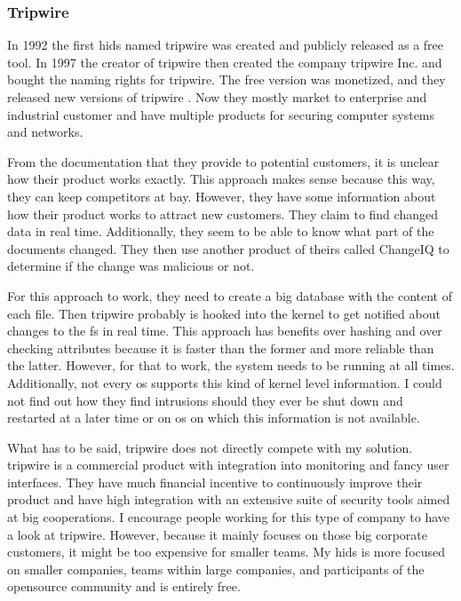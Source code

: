 \subsubsection{Tripwire}
\label{sec:tripwire}

In 1992 the first \gls{hids} named \gls{tripwire} was created and publicly released as a free tool. In 1997 the creator of \gls{tripwire} then created the company \Gls{tripwire} Inc. and bought the naming rights for \gls{tripwire}. The free version was monetized, and they released new versions of \gls{tripwire} \cite{Tripwire:Impl, Tripwire:company}. Now they mostly market to enterprise and industrial customer and have multiple products for securing computer systems and networks. \cite{tripwire}

From the documentation that they provide to potential customers, it is unclear how their product works exactly. This approach makes sense because this way, they can keep competitors at bay. However, they have some information about how their product works to attract new customers. They claim to find changed data in real time. Additionally, they seem to be able to know what part of the documents changed. They then use another product of theirs called ChangeIQ to determine if the change was malicious or not. \cite{tripwire:fim:datasheet, tripwire:true:intent}

For this approach to work, they need to create a big database with the content of each file. Then \gls{tripwire} probably is hooked into the kernel to get notified about changes to the \gls{fs} in real time. This approach has benefits over hashing and over checking attributes because it is faster than the former and more reliable than the latter. However, for that to work, the system needs to be running at all times. Additionally, not every \gls{os} supports this kind of kernel level information. I could not find out how they find \glspl{intrusion} should they ever be shut down and restarted at a later time or on \gls{os} on which this information is not available. 

What has to be said, \gls{tripwire} does not directly compete with my solution. \Gls{tripwire} is a commercial product with integration into monitoring and fancy user interfaces. They have much financial incentive to continuously improve their product and have high integration with an extensive suite of security tools aimed at big cooperations. I encourage people working for this type of company to have a look at \gls{tripwire}. However, because it mainly focuses on those big corporate customers, it might be too expensive for smaller teams. My \gls{hids} is more focused on smaller companies, teams within large companies, and participants of the \gls{opensource} community and is entirely free.

